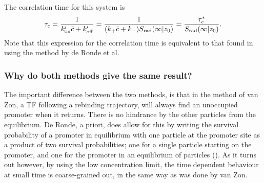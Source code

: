 The correlation time for this system is
\begin{equation}
 \tau_c = \frac{1}{k'_{\rm on} \bar{c} + k'_{\rm off}} = \frac{1}{ (k_+ \bar{c} + k_- ) S_{\rm rad}(\infty|z_0) } = \frac{\tau_c^*}{S_{\rm rad}(\infty|z_0)}.
\end{equation}
Note that this expression for the correlation time is equivalent to that found in  using the method by de Ronde et al. 

\subsubsection{Why do both methods give the same result?}
The important difference between the two methods, is that in the method of van Zon, a TF following a rebinding trajectory, will always find an unoccupied promoter when it returns. There is no hindrance by the other particles from the equilibrium. De Ronde, a priori, does allow for this by writing the survival probability of a promoter in equilibrium with one particle at the promoter site as a product of two survival probabilities; one for a single particle starting on the promoter, and one for the promoter in an equilibrium of particles (). As it turns out however, by using the low concentration limit, the time dependent behaviour at small time is coarse-grained out, in the same way as was done by van Zon.

